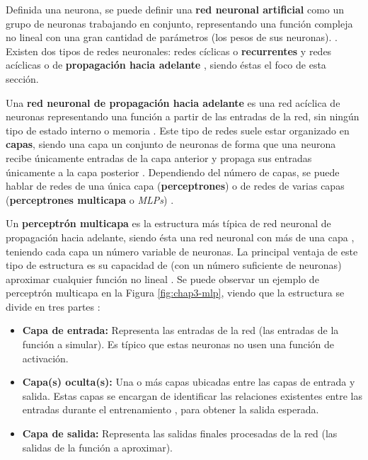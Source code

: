 Definida una neurona, se puede definir una \textbf{red neuronal artificial} como un grupo de neuronas trabajando en conjunto, representando una función compleja no lineal con una gran cantidad de parámetros (los pesos de sus neuronas). \cite{alma991004256519704990}. Existen dos tipos de redes neuronales: redes cíclicas o \textbf{recurrentes} y redes acíclicas o de \textbf{propagación hacia adelante} \cite{alma991004256519704990}, siendo éstas el foco de esta sección.

Una \textbf{red neuronal de propagación hacia adelante} es una red acíclica de neuronas representando una función a partir de las entradas de la red, sin ningún tipo de estado interno o memoria \cite{alma991004256519704990}. Este tipo de redes suele estar organizado en \textbf{capas}, siendo una capa un conjunto de neuronas de forma que una neurona recibe únicamente entradas de la capa anterior y propaga sus entradas únicamente a la capa posterior \cite{alma991004256519704990}. Dependiendo del número de capas, se puede hablar de redes de una única capa (\textbf{perceptrones}) o de redes de varias capas (\textbf{perceptrones multicapa} o \textit{MLPs}) \cite{alma991004256519704990}.

Un \textbf{perceptrón multicapa} es la estructura más típica de red neuronal de propagación hacia adelante, siendo ésta una red neuronal con más de una capa \cite{alma991004256519704990}, teniendo cada capa un número variable de neuronas. La principal ventaja de este tipo de estructura es su capacidad de (con un número suficiente de neuronas) aproximar cualquier función no lineal \cite{Goodfellow-et-al-2016}. Se puede observar un ejemplo de perceptrón multicapa en la Figura \ref{fig:chap3-mlp}, viendo que la estructura se divide en tres partes \cite{10.5555/3161223}:

\begin{itemize}
	\item \textbf{Capa de entrada:} Representa las entradas de la red (las entradas de la función a simular). Es típico que estas neuronas no usen una función de activación.
	\item \textbf{Capa(s) oculta(s):} Una o más capas ubicadas entre las capas de entrada y salida. Estas capas se encargan de identificar las relaciones existentes entre las entradas durante el entrenamiento \cite{10.5555/3161223}, para obtener la salida esperada.
	\item \textbf{Capa de salida:} Representa las salidas finales procesadas de la red (las salidas de la función a aproximar).
\end{itemize}

